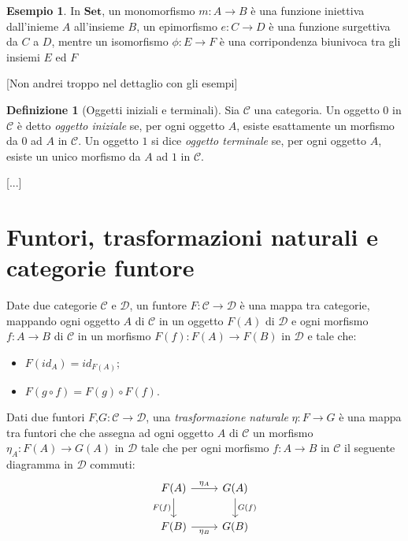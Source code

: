 \documentclass{article}
\theoremstyle{plain}
\theoremstyle{definition}
\newtheorem{definition}[theorem]{Definizione}
\newtheorem{example}[theorem]{Esempio}
\newcommand{\id}[1]{id_{#1}}
\begin{document}
	\begin{example}
		In $\textbf{Set}$, un monomorfismo $m: A \rightarrow B$ è una 
		funzione iniettiva dall'inieme $A$ all'insieme $B$,
		un epimorfismo $e: C \rightarrow D$ è una funzione surgettiva 
		da $C$ a $D$, mentre un isomorfismo $\phi: E \rightarrow F$
		è una corripondenza biunivoca tra gli insiemi $E$ ed $F$
	\end{example}

	[Non andrei troppo nel dettaglio con gli esempi]

	\begin{definition}[Oggetti iniziali e terminali]
		Sia $\mathcal{C}$ una categoria. 
		Un oggetto $0$ in $\mathcal{C}$ è detto \emph{oggetto iniziale} se, 
		per ogni oggetto $A$, esiste esattamente un morfismo da $0$ ad $A$ in $\mathcal{C}$.
		Un oggetto $1$ si dice \emph{oggetto terminale} se, per ogni oggetto $A$, 
		esiste un unico morfismo da $A$ ad $1$ in $\mathcal{C}$.  
	\end{definition}


	[...]

\section{Funtori, trasformazioni naturali e categorie funtore}

	Date due categorie $\mathcal{C}$ e $\mathcal{D}$, 
	un funtore $F: \mathcal{C} \rightarrow \mathcal{D}$ 
	è una mappa tra categorie, mappando ogni oggetto $A$ di $\mathcal{C}$ in un oggetto $F(A)$ di $\mathcal{D}$
	e ogni morfismo $f: A \rightarrow B$ di $\mathcal{C}$ in un morfismo $F(f): F(A) \rightarrow F(B)$ in $\mathcal{D}$ e tale che:
	\begin{itemize}
		\item $F(\id{A}) = \id{F(A)}$;
		\item $F(g \circ f) = F(g) \circ F(f)$.
	\end{itemize}

	Dati due funtori $F \text{,} G : \mathcal{C} \rightarrow \mathcal{D}$, una \emph{trasformazione naturale}
	$\eta: F \rightarrow G$ è una mappa tra funtori che 
	che assegna ad ogni oggetto $A$ di $\mathcal{C}$ un morfismo $\eta_A:F(A)\rightarrow G(A)$ in $\mathcal D$ tale che
	per ogni morfismo $f: A \rightarrow B$ in $\mathcal C$ il seguente diagramma in $\mathcal D$ commuti: 
	\[
		\begin{tikzcd}
			F(A) \arrow[r, "{\eta_A}"] \arrow[d, "F(f)" swap]& G(A) \arrow[d, "G(f)"] \\
			F(B) \arrow[r, "{\eta_B}" swap] & G(B)
		\end{tikzcd}
	\]
\end{document}

